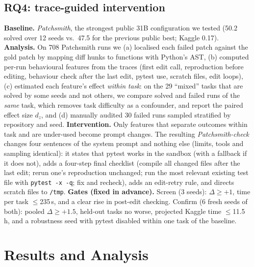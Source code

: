 \documentclass[conference]{IEEEtran}
\begin{document}
\subsection{RQ4: trace-guided intervention}
\textbf{Baseline.} \emph{Patchsmith}, the strongest public 31B configuration we tested (50.2 solved over 12 seeds vs.\ 47.5 for the previous public best; Kaggle 0.17).
\textbf{Analysis.} On 708 Patchsmith runs we (a) localised each failed patch against the gold patch by mapping diff hunks to functions with Python's AST, (b) computed per-run behavioural features from the traces (first edit call, reproduction before editing, behaviour check after the last edit, pytest use, scratch files, edit loops), (c) estimated each feature's effect \emph{within task}: on the 29 ``mixed'' tasks that are solved by some seeds and not others, we compare solved and failed runs of the \emph{same} task, which removes task difficulty as a confounder, and report the paired effect size $d_z$, and (d) manually audited 30 failed runs sampled stratified by repository and seed.
\textbf{Intervention.} Only features that separate outcomes within task and are under-used become prompt changes. The resulting \emph{Patchsmith-check} changes four sentences of the system prompt and nothing else (limits, tools and sampling identical): it states that pytest works in the sandbox (with a fallback if it does not), adds a four-step final checklist (compile all changed files after the last edit; rerun one's reproduction unchanged; run the most relevant existing test file with \texttt{pytest -x -q}; fix and recheck), adds an edit-retry rule, and directs scratch files to \texttt{/tmp}.
\textbf{Gates (fixed in advance).} Screen (3 seeds): $\Delta\ge+1$, time per task $\le$235\,s, and a clear rise in post-edit checking. Confirm (6 fresh seeds of both): pooled $\Delta\ge+1.5$, held-out tasks no worse, projected Kaggle time $\le$11.5\,h, and a robustness seed with pytest disabled within one task of the baseline.

\section{Results and Analysis}
\end{document}
